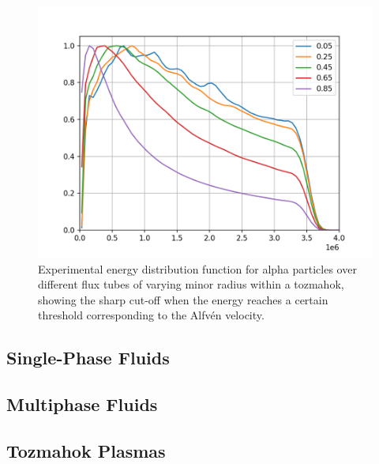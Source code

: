         \begin{figure}[!h]
            \centering
            \includegraphics{paper/1 - physical model and system of equations/4 - coupled fluid correction models/images/sharp cut-off energy distributions.png}
            \caption{Experimental energy distribution function for alpha particles over different flux tubes of varying minor radius within a tozmahok, showing the sharp cut-off when the energy reaches a certain threshold corresponding to the Alfvén velocity. }
            \label{sharp cut-off energy distributions}
        \end{figure}
    
    \subsection{Single-Phase Fluids}
    \subsection{Multiphase Fluids}
    \subsection{Tozmahok Plasmas}